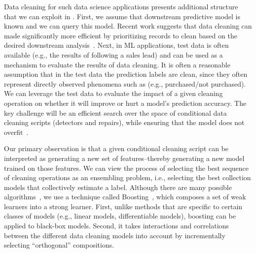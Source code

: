 Data cleaning for such data science applications presents additional structure that we can exploit in \sys.
First, we assume that downstream predictive model is known and we can query this model.
Recent work suggests that data cleaning can made significantly more efficient by prioritizing records to clean based on the  desired downstream analysis~\cite{altwaijry2015query, DBLP:conf/sigmod/BergmanMNT15, DBLP:journals/pvldb/KrishnanWWFG16}.
Next, in ML applications, test data is often available (e.g., the results of following a sales lead) and can be used as a mechanism to evaluate the results of data cleaning.  
It is often a reasonable assumption that in the test data the prediction labels are clean, since they often represent directly observed phenomena such as (e.g., purchased/not purchased).
We can leverage the test data to evaluate the impact of  a given cleaning operation on whether it will improve or hurt a model's prediction accuracy.
The key challenge will be an efficient search over the space of conditional data cleaning scripts (detectors and repairs), while ensuring that the model does not overfit~\cite{DBLP:journals/pvldb/KrishnanWWFG16,krishnan2016hilda}.   

Our primary observation is that a given conditional cleaning script can be interpreted as generating a new set of features--thereby generating a new model trained on those features. 
We can view the process of selecting the best sequence of cleaning operations as an ensembling problem, i.e., selecting the best collection models that collectively estimate a label. 
Although there are many possible algorithms~\cite{dietterich2000ensemble}, we use a technique called Boosting~\cite{freund1995desicion}, which composes a set of weak learners into a strong learner.  
First, unlike methods that are specific to certain classes of models (e.g., linear models, differentiable models), boosting can be applied to black-box models. 
Second, it takes interactions and correlations between the different data cleaning models into account by incrementally selecting ``orthogonal'' compositions.




